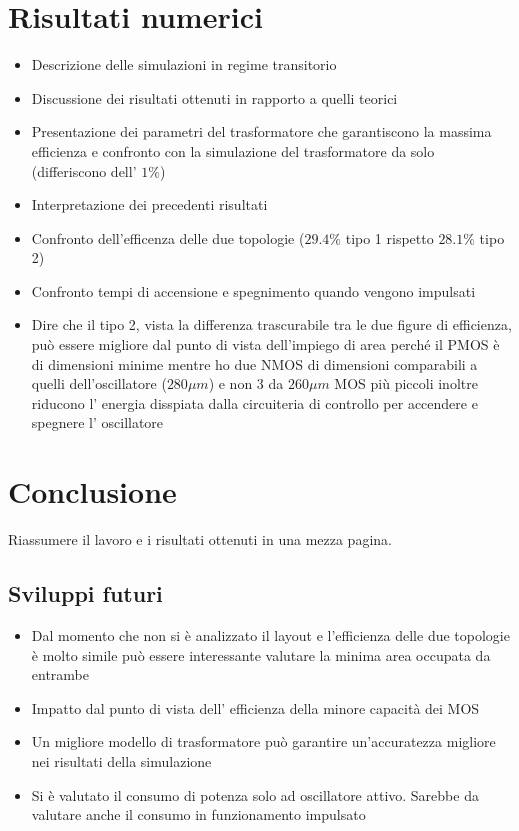 \documentclass[a4paper]{article}
\begin{document}
\section{Risultati numerici}
\begin{itemize}
	\item Descrizione delle simulazioni in regime transitorio
	\item Discussione dei risultati ottenuti in rapporto a quelli teorici
	\item Presentazione dei parametri del trasformatore che garantiscono
		la massima efficienza e confronto con la simulazione del
		trasformatore da solo (differiscono dell' $ 1\% $)
	\item Interpretazione dei precedenti risultati
	\item Confronto dell'efficenza delle due topologie 
		($ 29.4\% $ tipo 1 rispetto $ 28.1\% $ tipo 2)
	\item Confronto tempi di accensione e spegnimento quando vengono impulsati
	\item Dire che il tipo 2, vista la differenza trascurabile tra le due
		figure di efficienza, può essere migliore dal punto di vista 
		dell'impiego di area perché il PMOS è di dimensioni minime mentre 
		ho due NMOS di dimensioni comparabili a quelli dell'oscillatore 
		($ 280\mu m $) e non 3 da $ 260\mu m $
		MOS più piccoli inoltre riducono l' energia disspiata dalla
		circuiteria di controllo per accendere e spegnere l' oscillatore
\end{itemize}
\section{Conclusione}
Riassumere il lavoro e i risultati ottenuti in una mezza pagina.
\subsection{Sviluppi futuri}
\begin{itemize}
	\item Dal momento che non si è analizzato il layout e l'efficienza delle
		due topologie è molto simile può essere interessante valutare la 
		minima area occupata da entrambe
	\item Impatto dal punto di vista dell' efficienza della minore capacità
		dei MOS
	\item Un migliore modello di trasformatore può garantire un'accuratezza
		migliore nei risultati della simulazione
	\item Si è valutato il consumo di potenza solo ad oscillatore attivo.
		Sarebbe da valutare anche il consumo in funzionamento impulsato
\end{itemize}
\end{document}
